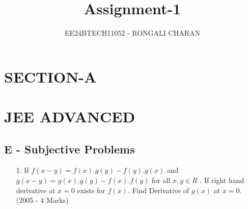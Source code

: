 \documentclass[journal,12pt,twocolumn]{IEEEtran}
\theoremstyle{remark}
\begin{document}

\vspace{3cm}

\title{\textbf{Assignment-1}}
\author{EE24BTECH11052 - RONGALI CHARAN}
\maketitle
\bigskip

\renewcommand{\thefigure}{\theenumi}
\renewcommand{\thetable}{\theenumi}
\onecolumn
\setlength{\columnsep}{2.5em}
\section*{\textbf{SECTION-A}}
\section*{\textbf{JEE ADVANCED}}
\subsection*{\textbf{E - Subjective Problems}}
\begin{enumerate}
    \item[ 1. ] If $f(x-y)=f(x).g(y)-f(y).g(x)$ and $ g(x-y)=g(x).g(y)-f(x).f(y) $ for all $x,y \in R $ . If right hand derivative at $x=0$ exists for $f(x)$. Find Derivative of $g(x)$ at $x=0$.
    \hfill(2005 - 4 Marks)
\end{enumerate}
\end{document}
